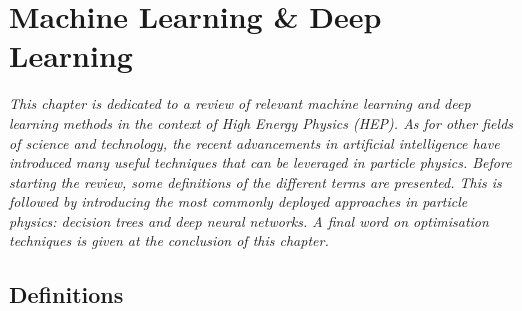 \chapter{\color{oxfordblue} Machine Learning \& Deep Learning}
\ChapFrame

\textit{
This chapter is dedicated to a review of relevant machine learning and deep learning methods in the context of High Energy Physics (HEP). As for other fields of science and technology, the recent advancements in artificial intelligence have introduced many useful techniques that can be leveraged in particle physics. Before starting the review, some definitions of the different terms are presented. This is followed by introducing the most commonly deployed approaches in particle physics: decision trees and deep neural networks. A final word on optimisation techniques is given at the conclusion of this chapter.
}

\section{Definitions}
